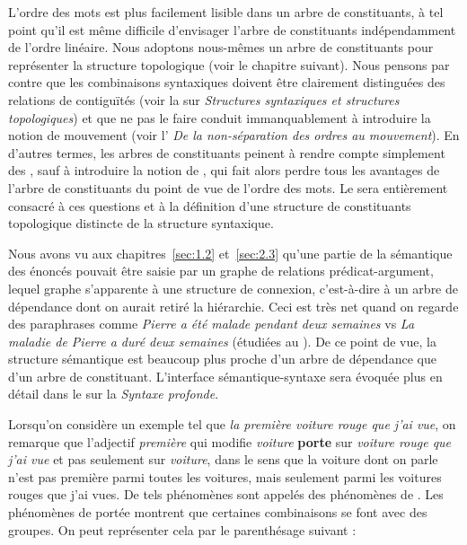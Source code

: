 {     
    L’ordre des mots est plus facilement lisible dans un arbre de constituants, à tel point qu’il est même difficile d’envisager l’arbre de constituants indépendamment de l’ordre linéaire. Nous adoptons nous-mêmes un arbre de constituants pour représenter la structure topologique (voir le chapitre suivant). Nous pensons par contre que les combinaisons syntaxiques doivent être clairement distinguées des relations de contiguïtés (voir la  sur \textit{Structures syntaxiques et structures topologiques}) et que ne pas le faire conduit immanquablement à introduire la notion de mouvement (voir l' \textit{De la non-séparation des ordres au mouvement}). En d’autres termes, les arbres de constituants peinent à rendre compte simplement des , sauf à introduire la notion de , qui fait alors perdre tous les avantages de l’arbre de constituants du point de vue de l’ordre des mots. Le  sera entièrement consacré à ces questions et à la définition d’une structure de constituants topologique distincte de la structure syntaxique.

    Nous avons vu aux chapitres~\ref{sec:1.2} et~\ref{sec:2.3} qu’une partie de la sémantique des énoncés pouvait être saisie par un graphe de relations prédicat-argument, lequel graphe s’apparente à une structure de connexion, c’est-à-dire à un arbre de dépendance dont on aurait retiré la hiérarchie. Ceci est très net quand on regarde des paraphrases comme \textit{Pierre a été malade pendant deux semaines} vs \textit{La maladie de Pierre a duré deux semaines} (étudiées au ). De ce point de vue, la structure sémantique est beaucoup plus proche d’un arbre de dépendance que d’un arbre de constituant. L'interface sémantique-syntaxe sera évoquée plus en détail dans le  sur la \textit{Syntaxe profonde}.

    Lorsqu’on considère un exemple tel que \textit{la première voiture rouge que j’ai vue}, on remarque que l’adjectif \textit{première} qui modifie \textit{voiture} \textbf{porte} sur \textit{voiture rouge que j’ai vue} et pas seulement sur \textit{voiture}, dans le sens que la voiture dont on parle n’est pas première parmi toutes les voitures, mais seulement parmi les voitures rouges que j’ai vues. De tels phénomènes sont appelés des phénomènes de . Les phénomènes de portée montrent que certaines combinaisons se font avec des groupes. On peut représenter cela par le parenthésage suivant :
    
}
